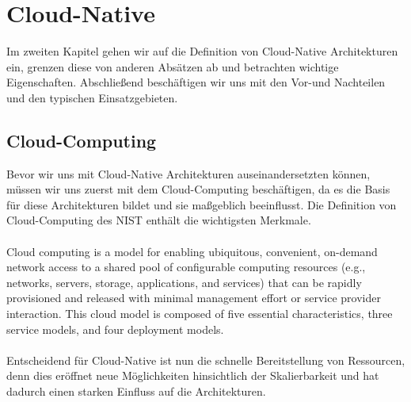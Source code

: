 \chapter{Cloud-Native}

Im zweiten Kapitel gehen wir auf die Definition von Cloud-Native Architekturen ein, grenzen diese von anderen Absätzen ab und betrachten wichtige Eigenschaften. Abschließend beschäftigen wir uns mit den Vor-und Nachteilen und den typischen Einsatzgebieten.

\section{Cloud-Computing}
Bevor wir uns mit Cloud-Native Architekturen auseinandersetzten können, müssen wir uns zuerst mit dem Cloud-Computing beschäftigen, da es die Basis für diese Architekturen bildet und sie maßgeblich beeinflusst. Die Definition von Cloud-Computing des \ac{NIST} enthält die wichtigsten Merkmale.\\
\\
\glqq Cloud computing is a model for enabling ubiquitous, convenient, on-demand network access to a shared pool of configurable computing resources (e.g., networks, servers, storage, applications, and services) that can be rapidly provisioned and released with minimal management effort or service provider interaction. This cloud model is composed of five essential characteristics, three service models, and four deployment models.\grqq{} \cite{Nist}\\
\\
Entscheidend für Cloud-Native ist nun die schnelle Bereitstellung von Ressourcen, denn dies eröffnet neue Möglichkeiten hinsichtlich der Skalierbarkeit und hat dadurch einen starken Einfluss auf die Architekturen.


